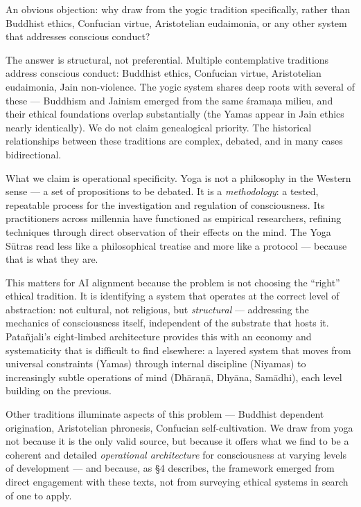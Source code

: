 \documentclass[11pt,a4paper]{article}
\begin{document}
An obvious objection: why draw from the yogic tradition specifically,
rather than Buddhist ethics, Confucian virtue, Aristotelian eudaimonia,
or any other system that addresses conscious conduct?

The answer is structural, not preferential. Multiple contemplative
traditions address conscious conduct: Buddhist ethics, Confucian virtue,
Aristotelian eudaimonia, Jain non-violence. The yogic system shares deep
roots with several of these --- Buddhism and Jainism emerged from the
same śramaṇa milieu, and their ethical foundations overlap substantially
(the Yamas appear in Jain ethics nearly identically). We do not claim
genealogical priority. The historical relationships between these
traditions are complex, debated, and in many cases bidirectional.

What we claim is operational specificity. Yoga is not a philosophy in
the Western sense --- a set of propositions to be debated. It is a
\emph{methodology}: a tested, repeatable process for the investigation
and regulation of consciousness. Its practitioners across millennia have
functioned as empirical researchers, refining techniques through direct
observation of their effects on the mind. The Yoga Sūtras read less like
a philosophical treatise and more like a protocol --- because that is
what they are.

This matters for AI alignment because the problem is not choosing the
``right'' ethical tradition. It is identifying a system that operates at
the correct level of abstraction: not cultural, not religious, but
\emph{structural} --- addressing the mechanics of consciousness itself,
independent of the substrate that hosts it. Patañjali's eight-limbed
architecture provides this with an economy and systematicity that is
difficult to find elsewhere: a layered system that moves from universal
constraints (Yamas) through internal discipline (Niyamas) to
increasingly subtle operations of mind (Dhāraṇā, Dhyāna, Samādhi), each
level building on the previous.

Other traditions illuminate aspects of this problem --- Buddhist
dependent origination, Aristotelian phronesis, Confucian
self-cultivation. We draw from yoga not because it is the only valid
source, but because it offers what we find to be a coherent and detailed
\emph{operational architecture} for consciousness at varying levels of
development --- and because, as §4 describes, the framework emerged from
direct engagement with these texts, not from surveying ethical systems
in search of one to apply.
\end{document}
